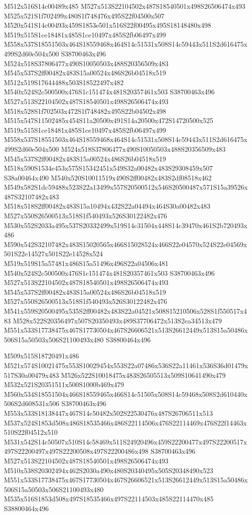 \documentclass{article}
\begin{document}
\begin{multicols}{2}
M512x516S14c00489x485 M527x513S22104502x487S18540501x498S26506474x493 M525x521S1f702499x480S1f748476x495S22f04500x507 M520x541S14c00493x459S1853e501x516S22f00495x495S18148480x498 M519x515S1ce18481x485S1ce10497x485S2fb06497x499 M558x537S18551503x464S18559468x464S14c51531x508S14c59443x511S2d616475x499S2d60e504x500 S38700463x496 M524x518S37806477x490S10050503x488S20356509x483 M545x537S2ff00482x483S15a00524x486S26b04518x519 M512x519S17644488x503S18522497x482 M540x524S2c500500x476S1c151474x481S20357461x503 S38700463x496 M527x513S22104502x487S18540501x498S26506474x493 M518x528S1f702503x472S1f748482x495S22b04502x498 M515x547S11502485x454S11a20500x491S14a20500x472S14720500x525 M519x515S1ce18481x485S1ce10497x485S2fb06497x499 M558x537S18551503x464S18559468x464S14c51531x508S14c59443x511S2d616475x499S2d60e504x500 M524x518S37806477x490S10050503x488S20356509x483 M545x537S2ff00482x483S15a00524x486S26b04518x519 M518x590S1534e453x575S15342451x549S32a00482x483S29308459x507 S38a00464x490 M540x520S10011519x490S2ff00482x483S2df08518x462 M549x582S1dc59488x523S22a13499x557S20500512x546S20500487x571S15a39526x487S32107482x483 M518x518S2ff00482x483S15a10494x432S22a04494x464S30a00482x483 M527x550S26500513x518S1f540493x526S30122482x476 M530x552S2033a495x537S20332499x519S14c31504x448S14c39470x461S2b720493x486 M590x542S32107482x483S15020565x466S15028524x466S22e04570x524S22e04569x501S22e14527x501S22e14528x524 M519x519S15a57481x486S15a51496x496S22a04506x481 M540x524S2c500500x476S1c151474x481S20357461x503 S38700463x496 M527x513S22104502x487S18540501x498S26506474x493 M545x537S2ff00482x483S15a00524x486S26b04518x519 M527x550S26500513x518S1f540493x526S30122482x476 M541x559S20500495x535S2ff00482x483S22a04521x508S15210506x528S1f550517x483 M528x522S20356497x507S20350493x489S37706472x513S2ea34513x479 M551x533S17738475x467S17730504x467S26606521x513S26612449x513S15a50486x506S15a50503x506S21100493x480 S38800464x496

M509x515S18720491x486 M521x574S10021475x553S10029454x553S22a07486x536S22a11461x536S36d01479x517S30a00479x483 M526x522S10018475x483S26505513x509S10641490x479 M532x521S20351511x500S1000b469x479 M560x534S18551504x466S18559465x466S14c51505x508S14c59468x508S2d610440x506S2d608531x506 S38700463x496 M553x533S18138447x467S14c50482x502S22530476x487S26706511x513 M537x524S1853d508x486S18535466x486S22114506x476S22114469x476S22f14463x510S22f04512x510 M531x542S14c50507x510S14c58469x511S24920496x459S22200477x497S22200517x497S22200497x497S22200508x497S22200486x498 S38700463x496 M527x513S22104502x487S18540501x498S26506474x493 M510x538S20302494x462S2030a490x480S20340495x505S20348490x523 M551x533S17738475x467S17730504x467S26606521x513S26612449x513S15a50486x506S15a50503x506S21100493x480 M535x516S1853d508x497S18535466x497S22114503x485S22114470x485 S38800464x496


\end{multicols}
\end{document}
